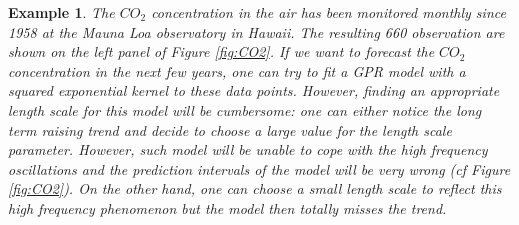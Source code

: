 \documentclass[twoside,openright]{report}
\newtheorem{example}{Example}
\begin{document}
\begin{example}
	The $CO_2$ concentration in the air has been monitored monthly since 1958 at the Mauna Loa observatory in Hawaii. The resulting  660 observation are shown on the left panel of Figure \ref{fig:CO2}. If we want to forecast the $CO_2$ concentration in the next few years, one can try to fit a GPR model with a squared exponential kernel to these data points. However, finding an appropriate length scale for this model will be cumbersome: one can either notice the long term raising trend and decide to choose a large value for the length scale parameter. However, such model will be unable to cope with the high frequency oscillations and the prediction intervals of the model will be very wrong (cf Figure \ref{fig:CO2}). On the other hand, one can choose a small length scale to reflect this high frequency phenomenon but the model then totally misses the trend. 


\end{example}
\end{document}

